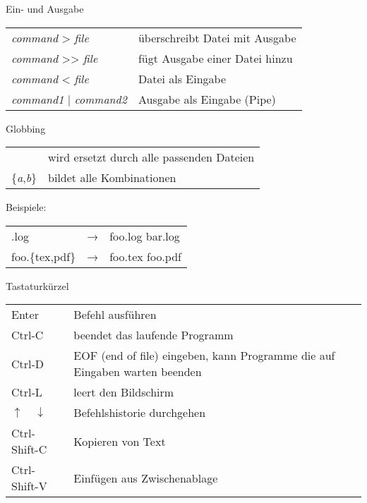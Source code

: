 \begin{frame}{Ein- und Ausgabe}
  \begin{tabu}{>{\ttfamily}l X[,L]}
    \textit{command} > \textit{file}      & überschreibt Datei mit Ausgabe \\
    \textit{command} >> \textit{file}     & fügt Ausgabe einer Datei hinzu \\
    \textit{command} < \textit{file}      & Datei als Eingabe \\
    \textit{command1} | \textit{command2} & Ausgabe als Eingabe (Pipe)
  \end{tabu}
\end{frame}

\begin{frame}{Globbing}
  \begin{tabu}{>{\ttfamily}l X[,L]}
    *                         & wird ersetzt durch alle passenden Dateien \\
    \{\textit{a},\textit{b}\} & bildet alle Kombinationen
  \end{tabu}

  \vspace{2cm}
  Beispiele:\\[10pt]
  \begin{tabu}{>{\ttfamily}l c >{\ttfamily}l}
    *.log           & → & foo.log bar.log \\
    foo.\{tex,pdf\} & → & foo.tex foo.pdf
  \end{tabu}
\end{frame}

\begin{frame}{Tastaturkürzel}
  \begin{tabu}{>{\ttfamily}l X[,L]}
    Enter & Befehl ausführen \\
    Ctrl-C & beendet das laufende Programm \\
    Ctrl-D & EOF (end of file) eingeben, kann Programme die auf Eingaben warten beenden \\
    Ctrl-L & leert den Bildschirm \\
    $\uparrow \quad \downarrow$ & Befehlshistorie durchgehen\\
    Ctrl-Shift-C & Kopieren von Text \\
    Ctrl-Shift-V & Einfügen aus Zwischenablage \\
  \end{tabu}
\end{frame}

